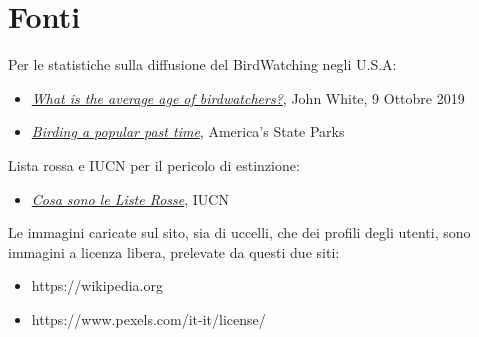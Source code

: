 \documentclass[12pt, a4paper]{article}
\begin{document}
    \section{Fonti}
    Per le statistiche sulla diffusione del BirdWatching negli U.S.A:
    \begin{itemize}
        \item  \href{https://chirpbirding.com/blog/111/what-is-the-average-age-of-birdwatchers/}{\emph{What is the average age of birdwatchers?}}, John White, 9 Ottobre 2019
        \item  \href{https://www.americasstateparks.org/birding-a-popular-past-time/}{\emph{Birding a popular past time}}, America's State Parks
    \end{itemize}
    Lista rossa e IUCN per il pericolo di estinzione:
    \begin{itemize}
        \item \href{http://www.iucn.it/liste-rosse-cosa-sono.php}{\emph{Cosa sono le Liste Rosse}}, IUCN
    \end{itemize}
    Le immagini caricate sul sito, sia di uccelli, che dei profili degli utenti, sono immagini a licenza libera, prelevate da questi due siti:
    \begin{itemize}
        \item https://wikipedia.org 
        \item https://www.pexels.com/it-it/license/    
    \end{itemize}
\end{document}
